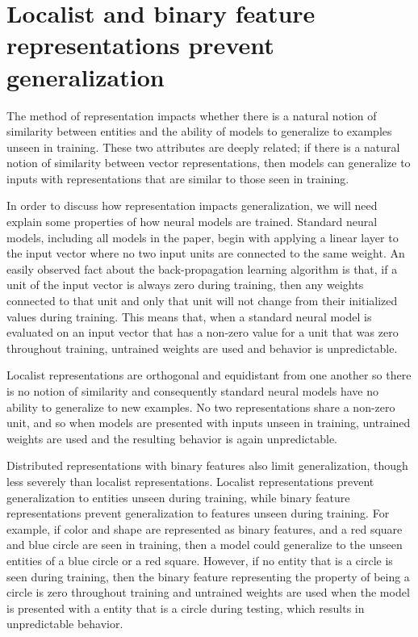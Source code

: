 \section{Localist and binary feature representations prevent generalization}\label{app:generalization}

The method of representation impacts whether there is a natural notion of similarity between entities and the ability of models to generalize to examples unseen in training. These two attributes are deeply related; if there is a natural notion of similarity between vector representations, then models can generalize to inputs with representations that are similar to those seen in training.

In order to discuss how representation impacts generalization, we will need explain some properties of how neural models are trained. Standard neural models, including all models in the paper, begin with applying a linear layer to the input vector where no two input units are connected to the same weight. An easily observed fact about the back-propagation learning algorithm is that, if a unit of the input vector is always zero during training, then any weights connected to that unit and only that unit will not change from their initialized values during training. This means that, when a standard neural model is evaluated on an input vector that has a non-zero value for a unit that was zero throughout training, untrained weights are used and behavior is unpredictable.

Localist representations are orthogonal and equidistant from one another so there is no notion of similarity and consequently standard neural models have no ability to generalize to new examples. No two representations share a non-zero unit, and so when models are presented with inputs unseen in training, untrained weights are used and the resulting behavior is again unpredictable.

Distributed representations with binary features also limit generalization, though less severely than localist representations. Localist representations prevent generalization to entities unseen during training, while binary feature representations prevent generalization to features unseen during training. For example, if color and shape are represented as binary features, and a red square and blue circle are seen in training, then a model could generalize to the unseen entities of a blue circle or a red square. However, if no entity that is a circle is seen during training, then the binary feature representing the property of being a circle is zero throughout training and untrained weights are used when the model is presented with a entity that is a circle during testing, which results in unpredictable behavior.

